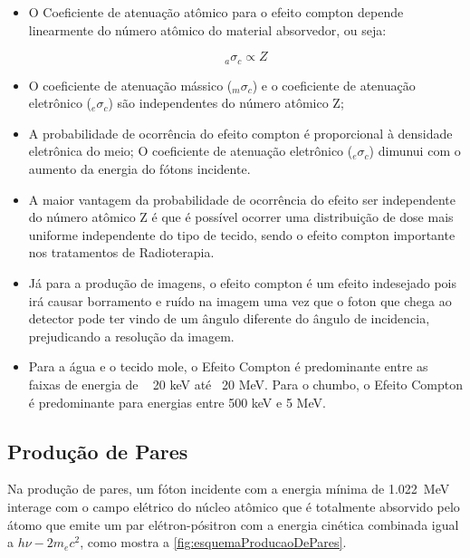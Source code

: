 \documentclass[11pt,a4paper]{article}
\begin{document}
                    \begin{itemize}
                        \item O Coeficiente de atenuação atômico para o efeito compton depende linearmente do número atômico do material absorvedor, ou seja:
                        
                            $${}_a\sigma_c \propto Z $$

                        \item O coeficiente de atenuação mássico (${}_m\sigma_c$) e o coeficiente de atenuação eletrônico (${}_e\sigma_c$) são independentes do número atômico Z;
                        
                        \item A probabilidade de ocorrência do efeito compton é proporcional à densidade eletrônica do meio; O coeficiente de atenuação eletrônico (${}_e\sigma_c$) dimunui com o aumento da energia do fótons incidente.
                        
                        \item A maior vantagem da probabilidade de ocorrência do efeito ser independente do número atômico Z é que é possível ocorrer uma distribuição de dose mais uniforme independente do tipo de tecido, sendo o efeito compton importante nos tratamentos de Radioterapia.
                        
                        \item Já para a produção de imagens, o efeito compton é um efeito indesejado pois irá causar borramento e ruído na imagem uma vez que o foton que chega ao detector pode ter vindo de um ângulo diferente do ângulo de incidencia, prejudicando a resolução da imagem.
                        
                        \item Para a água e o tecido mole, o Efeito Compton é predominante entre as faixas de energia de ~ 20 keV até ~20 MeV. Para o chumbo, o Efeito Compton é predominante para energias entre 500 keV e 5 MeV.
                    \end{itemize}
            
        \subsection{Produção de Pares}

                Na produção de pares, um fóton incidente com a energia mínima de \qty{1.022}{MeV} interage com o campo elétrico do núcleo atômico que é totalmente absorvido pelo átomo que emite um par elétron-pósitron com a energia cinética combinada igual a $h\nu - 2 m_ec^2$, como mostra a \ref{fig:esquemaProducaoDePares}.
\end{document}
